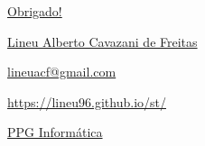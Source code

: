 \documentclass[10pt,
  aspectratio=169,
  serif,
  mathserif,
  professionalfont,
  compress,
  handout,
  ]{beamer}\usepackage[]{graphicx}\usepackage[]{color}
\begin{document}
\begin{frame}[c, allowframebreaks]

\begin{center}

  {\huge \href{https://lineu96.github.io/st/}{Obrigado!}}
  
  \vspace{0.5cm}
    
  {\normalsize \href{https://lineu96.github.io/st/}{Lineu Alberto Cavazani de Freitas}}
  
  {\normalsize \href{https://lineu96.github.io/st/}{lineuacf@gmail.com}}
  
  {\normalsize \href{https://lineu96.github.io/st/}{https://lineu96.github.io/st/}}
  
  {\normalsize \href{http://www.prppg.ufpr.br/ppginformatica/?lang=pb}{PPG Informática}}


\begin{figure} %
\end{figure} %

\end{center}

\end{frame}
\end{document}
